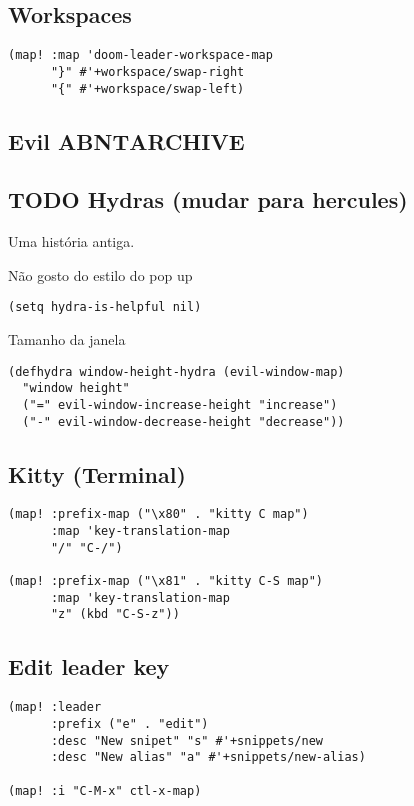 \documentclass[11pt]{article}
\begin{document}
\subsection{Workspaces}
\label{sec:org7516ae1}
\begin{verbatim}
(map! :map 'doom-leader-workspace-map
      "}" #'+workspace/swap-right
      "{" #'+workspace/swap-left)
\end{verbatim}

\subsection{Evil ABNT\hfill{}\textsc{ARCHIVE}}
\label{sec:org7ab3ce3}

\subsection{{\bfseries\sffamily TODO} Hydras (mudar para hercules)}
\label{sec:org66ae87d}
Uma história antiga.

Não gosto do estilo do pop up
\begin{verbatim}
(setq hydra-is-helpful nil)
\end{verbatim}

Tamanho da janela
\begin{verbatim}
(defhydra window-height-hydra (evil-window-map)
  "window height"
  ("=" evil-window-increase-height "increase")
  ("-" evil-window-decrease-height "decrease"))
\end{verbatim}

\subsection{Kitty (Terminal)}
\label{sec:orga8af5e9}
\begin{verbatim}
(map! :prefix-map ("\x80" . "kitty C map")
      :map 'key-translation-map
      "/" "C-/")

(map! :prefix-map ("\x81" . "kitty C-S map")
      :map 'key-translation-map
      "z" (kbd "C-S-z"))
\end{verbatim}

\subsection{Edit leader key}
\label{sec:org101fd72}
\begin{verbatim}
(map! :leader
      :prefix ("e" . "edit")
      :desc "New snipet" "s" #'+snippets/new
      :desc "New alias" "a" #'+snippets/new-alias)

(map! :i "C-M-x" ctl-x-map)
\end{verbatim}
\end{document}
